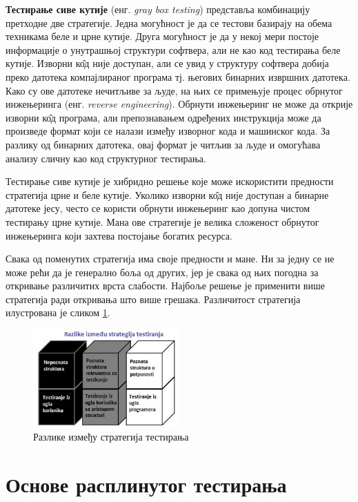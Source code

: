 \documentclass[12pt,oneside]{memoir}
\begin{document}
\begin{description}
\item \textbf{Тестирање сиве кутије} (енг. \textit{gray box testing}) представља комбинацију претходне две стратегије. Једна могућност је да се тестови базирају на обема техникама беле и црне кутије. Друга могућност је да у некој мери постоје информације о унутрашњој структури софтвера, али не као код тестирања беле кутије. Изворни к\^{о}д није доступан, али се увид у структуру софтвера добија преко датотека компајлираног програма тј. његових бинарних извршних датотека. Како су ове датотеке нечитљиве за људе, на њих се примењује процес обрнутог инжењеринга (енг. \textit{reverse engineering}). Обрнути инжењеринг не може да открије изворни к\^{о}д програма, али препознавањем одређених инструкција може да произведе формат који се налази између изворног кода и машинског кода. За разлику од бинарних датотека, овај формат је читљив за људе и омогућава анализу сличну као код структурног тестирања. 
\par Тестирање сиве кутије је хибридно решење које може искористити предности стратегија црне и беле кутије. Уколико изворни к\^{о}д није доступан а бинарне датотеке јесу, често се користи обрнути инжењеринг као допуна чистом тестирању црне кутије. Мана ове стратегије је велика сложеност обрнутог инжењеринга који захтева постојање богатих ресурса.
\end{description}

Свака од поменутих стратегија има своје предности и мане. Ни за једну се не може рећи да је генерално боља од других, јер је свака од њих погодна за откривање различитих врста слабости. Најбоље решење је применити више стратегија ради откривања што више грешака. Различитост стратегија илустрована је сликом \ref{fig:boxes}.

\begin{figure}[!ht]
\centering
\includegraphics[width=0.5\textwidth]{boxes.jpg}
\caption{Разлике између стратегија тестирања}
\label{fig:boxes}
\end{figure}

\section{Основе расплинутог тестирања}
\label{sec:osnoveRasplTestiranja}
\end{document}
